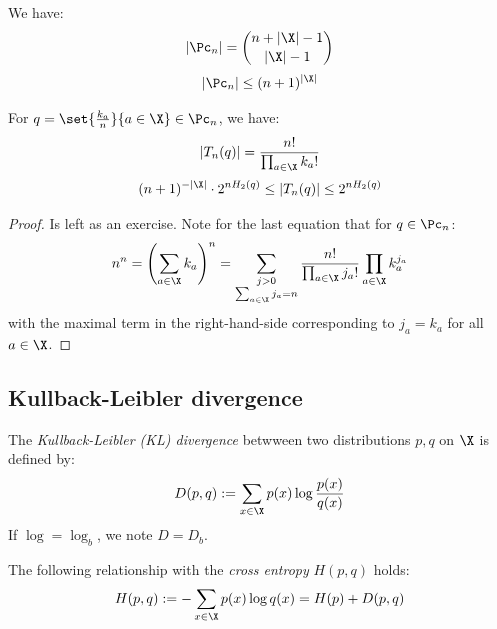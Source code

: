 \documentclass[toc, titlepaged]{../cs-classes/cs-classes}
\begin{document}
\begin{lemma}
    We have:
    \begin{equation}
        |\Pc_n|=\binom{n+|\X|-1}{|\X|-1}
    \end{equation}
    \begin{equation}
        |\Pc_n|\leq(n+1)^{|\X|}
    \end{equation}

    For $q=\set{\frac{k_a}{n}}{a\in\X}\in\Pc_n$, we have:
    \begin{equation}
        |T_n(q)|=\frac{n!}{\prod_{a\in\X}k_a!}
    \end{equation}
    \begin{equation}
        (n+1)^{-|\X|} \cdot 2^{nH_2(q)} \leq |T_n(q)| \leq 2^{nH_2(q)}
    \end{equation}
\end{lemma}
\begin{proof}
    Is left as an exercise. Note for the last equation that for $q\in\Pc_n$:
    \begin{equation*}
        n^n = \left(\sum_{a\in\X}k_a\right)^n = \sum_{\substack{j>0\\\sum_{a\in\X}j_a=n}} \frac{n!}{\prod_{a\in\X}j_a!} \prod_{a\in\X}k_a^{j_a}
    \end{equation*}
    with the maximal term in the right-hand-side corresponding to $j_a=k_a$ for all $a\in\X$.
\end{proof}

\subsection{Kullback-Leibler divergence}
\begin{definition}
    The \emph{Kullback-Leibler (KL) divergence} betwween two distributions $p, q$ on $\X$ is defined by:
    \begin{equation*}
        D(p, q) := \sum_{x\in\X}p(x)\log\frac{p(x)}{q(x)}
    \end{equation*}
    If $\log=\log_b$, we note $D=D_b$.
\end{definition}

\begin{property}
    The following relationship with the \emph{cross entropy} $H(p, q)$ holds:
    \begin{equation}
        \label{eq:relationship-cross-entropy}
        H(p, q) := - \sum_{x\in\X}p(x)\log q(x) = H(p) + D(p, q)
    \end{equation}
\end{property}
\end{document}
